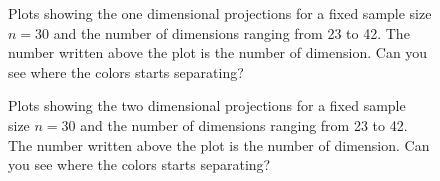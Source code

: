 \documentclass[12]{article}
\begin{document}

\begin{figure}[hbtp]
   \centering
       \caption{Plots showing the one dimensional projections for a fixed sample size $n=30$ and the number of dimensions ranging from 23 to 42. The number written above the plot is the number of dimension. Can you see where the colors starts separating?  }
       \label{conf_int}
\end{figure}

\begin{figure}[hbtp]
   \centering
       \caption{Plots showing the two dimensional projections for a fixed sample size $n=30$ and the number of dimensions ranging from 23 to 42. The number written above the plot is the number of dimension. Can you see where the colors starts separating?  }
       \label{conf_int1}
\end{figure}
\end{document}
